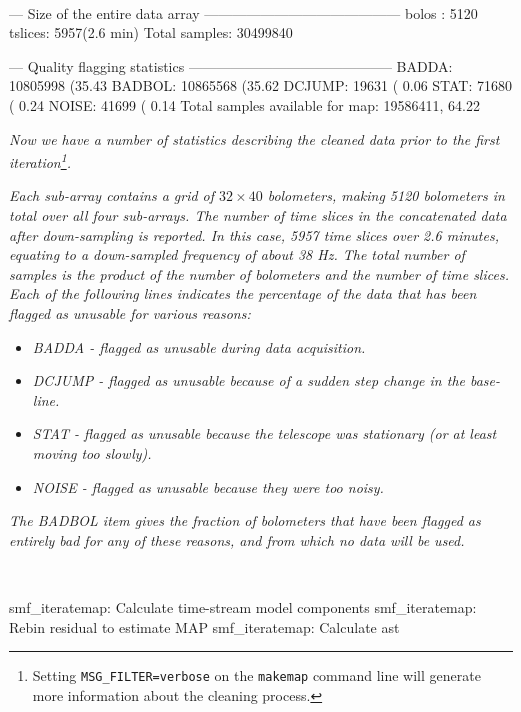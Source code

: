 ~
\begin{terminalv}
--- Size of the entire data array ------------------------------------------
bolos  : 5120
tslices: 5957(2.6 min)
Total samples: 30499840
\begin{terminalv}
--- Quality flagging statistics --------------------------------------------
 BADDA:   10805998 (35.43%
BADBOL:   10865568 (35.62%
DCJUMP:      19631 ( 0.06%
  STAT:      71680 ( 0.24%
 NOISE:      41699 ( 0.14%
Total samples available for map:   19586411, 64.22%
\end{terminalv}

\emph{Now we have a number of statistics describing the cleaned data
prior to the first iteration\footnote{Setting
\texttt{MSG\_FILTER=verbose} on the \texttt{makemap} command line will
generate more information about the cleaning process.}.}

\emph{Each sub-array contains a grid of $32\times40$ bolometers, making 5120
bolometers in total over all four sub-arrays. The number of time slices in
the concatenated data after down-sampling is reported. In this case, 5957
time slices over 2.6 minutes, equating to a down-sampled frequency of about
38 Hz. The total number of samples is the product of the number of
bolometers and the number of time slices. Each of the following lines
indicates the percentage of the data that has been flagged as unusable for
various reasons:}

\begin{itemize}
\item \emph{BADDA - flagged as unusable during data acquisition.}
\item \emph{DCJUMP - flagged as unusable because of a sudden step change in
the base-line.}
\item \emph{STAT - flagged as unusable because the telescope was stationary
(or at least moving too slowly).}
\item \emph{NOISE - flagged as unusable because they were too noisy.}
\end{itemize}

\emph{The BADBOL item gives the fraction of bolometers that have been
flagged as entirely bad for any of these reasons, and from which no data
will be used.}

~
\begin{terminalv}
smf_iteratemap: Calculate time-stream model components
smf_iteratemap: Rebin residual to estimate MAP
smf_iteratemap: Calculate ast
\end{terminalv}


\end{terminalv}
